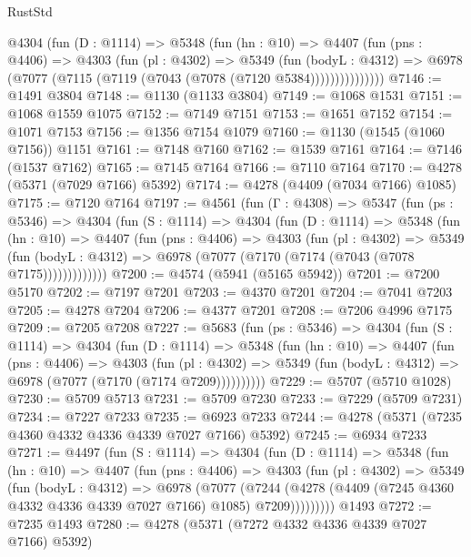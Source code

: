 \begin{lexlean}{RustStd}
\begin{coremodule}
          @4304
            (fun (D : @1114) =>
            @5348
              (fun (hn : @10) =>
              @4407
                (fun (pns : @4406) =>
                @4303
                  (fun (pl : @4302) =>
                  @5349
                    (fun (bodyL : @4312) =>
                    @6978 (@7077 (@7115 (@7119 (@7043 (@7078 (@7120 @5384)))))))))))))))
@7146 := @1491 @3804
@7148 := @1130 (@1133 @3804)
@7149 := @1068 @1531
@7151 := @1068 @1559 @1075
@7152 := @7149 @7151
@7153 := @1651 @7152
@7154 := @1071 @7153
@7156 := @1356 @7154 @1079
@7160 := @1130 (@1545 (@1060 @7156)) @1151
@7161 := @7148 @7160
@7162 := @1539 @7161
@7164 := @7146 (@1537 @7162)
@7165 := @7145 @7164
@7166 := @7110 @7164
@7170 := @4278 (@5371 (@7029 @7166) @5392)
@7174 := @4278 (@4409 (@7034 @7166) @1085)
@7175 := @7120 @7164
@7197 := @4561
    (fun (Γ : @4308) =>
    @5347
      (fun (ps : @5346) =>
      @4304
        (fun (S : @1114) =>
        @4304
          (fun (D : @1114) =>
          @5348
            (fun (hn : @10) =>
            @4407
              (fun (pns : @4406) =>
              @4303
                (fun (pl : @4302) =>
                @5349
                  (fun (bodyL : @4312) =>
                  @6978 (@7077 (@7170 (@7174 (@7043 (@7078 @7175)))))))))))))
@7200 := @4574 (@5941 (@5165 @5942))
@7201 := @7200 @5170
@7202 := @7197 @7201
@7203 := @4370 @7201
@7204 := @7041 @7203
@7205 := @4278 @7204
@7206 := @4377 @7201
@7208 := @7206 @4996 @7175
@7209 := @7205 @7208
@7227 := @5683
    (fun (ps : @5346) =>
    @4304
      (fun (S : @1114) =>
      @4304
        (fun (D : @1114) =>
        @5348
          (fun (hn : @10) =>
          @4407
            (fun (pns : @4406) =>
            @4303
              (fun (pl : @4302) =>
              @5349 (fun (bodyL : @4312) => @6978 (@7077 (@7170 (@7174 @7209))))))))))
@7229 := @5707 (@5710 @1028)
@7230 := @5709 @5713
@7231 := @5709 @7230
@7233 := @7229 (@5709 @7231)
@7234 := @7227 @7233
@7235 := @6923 @7233
@7244 := @4278 (@5371 (@7235 @4360 @4332 @4336 @4339 @7027 @7166) @5392)
@7245 := @6934 @7233
@7271 := @4497
    (fun (S : @1114) =>
    @4304
      (fun (D : @1114) =>
      @5348
        (fun (hn : @10) =>
        @4407
          (fun (pns : @4406) =>
          @4303
            (fun (pl : @4302) =>
            @5349
              (fun (bodyL : @4312) =>
              @6978
                (@7077
                  (@7244
                    (@4278 (@4409 (@7245 @4360 @4332 @4336 @4339 @7027 @7166) @1085) @7209)))))))))
    @1493
@7272 := @7235 @1493
@7280 := @4278 (@5371 (@7272 @4332 @4336 @4339 @7027 @7166) @5392)

\end{coremodule}
\end{lexlean}
